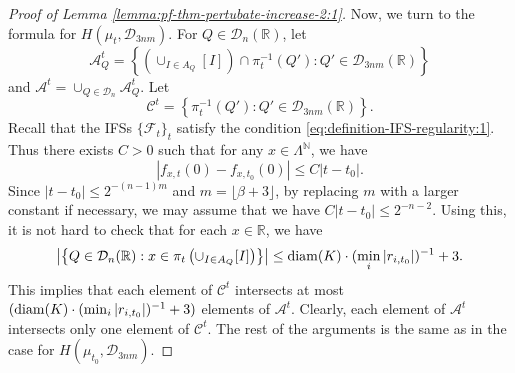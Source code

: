 \documentclass[a4paper,11pt]{amsart}
\theoremstyle{definition}
\numberwithin{equation}{section}
\def\D{\mathcal{D}}
\def\F{\mathcal F}
\def\N{\mathbb N}
\def\R{\mathbb R}
\begin{document}
\begin{proof}[Proof of Lemma \ref{lemma:pf-thm-pertubate-increase-2:1}]
 Now,  we turn to the formula for $H(\mu_{t},\D_{3nm})$.   For $Q\in \D_n(\R)$,  let 
\[
\mathcal{A}_Q^t=\left\{  \left(\cup_{I\in A_Q}[I]\right)\cap \pi_{t}^{-1} (Q'):   Q'\in \D_{3nm}(\R)  \right\}
\]
and $\mathcal{A} ^t= \cup_{Q\in \D_n} \mathcal{A}_Q^t$. Let 
\[
\mathcal{C}^t = \left\{  \pi_{t}^{-1} (Q'):   Q'\in \D_{3nm}(\R) \right\}.
\]
Recall that the IFSs $\{\F_t\}_t$ satisfy the condition \eqref{eq:definition-IFS-regularity:1}. Thus there exists $C>0$ such that for any $x\in \Lambda^\N$,  we have 
\[
|f_{x,t}(0)-f_{x,t_0}(0) |\le C|t-t_0|.
\] 
Since $|t-t_0| \le  2^{-(n-1)m}$ and $m=\lfloor \beta+3\rfloor$,  by replacing $m$ with a larger constant if necessary,  we may assume that we have $C|t-t_0|\le 2^{-n-2}$.  Using this, it is not hard to check that for each $x\in \R$, we have 
\[
\left|\left\{Q\in \D_n(\R): x\in \pi_{t}\left(\cup_{I\in A_Q}[I]\right)\right\}\right| \le {\rm diam}(K)\cdot (\min_{i}|r_{i,t_0}|)^{-1} +3.
\]
This implies that each element of $\mathcal{C}^t$  intersects  at most $({\rm diam}(K)\cdot (\min_{i}|r_{i,t_0}|)^{-1} +3)$ elements  of $\mathcal{A}^t$.  Clearly, each element of $\mathcal{A}^t$ intersects only one element  of $\mathcal{C}^t$.  The rest of the arguments is the same as in the case for $H(\mu_{t_0},\D_{3nm})$. 
\end{proof}  
\end{document}
